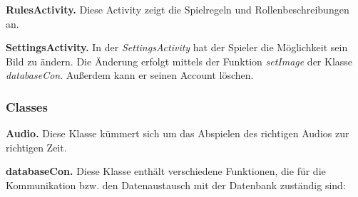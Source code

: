 \documentclass[12pt, a4paper]{article}
\begin{document}
\vspace{0,3 cm}
      
\textbf{RulesActivity.}
Diese Activity zeigt die Spielregeln und Rollenbeschreibungen an.

\vspace{0,3 cm}
      
\textbf{SettingsActivity.}
In der \textit{SettingsActivity} hat der Spieler die Möglichkeit sein Bild zu ändern. Die Änderung erfolgt mittels der Funktion \textit{setImage} der Klasse \textit{databaseCon}. Außerdem kann er seinen Account löschen.
  
  
		\subsubsection{Classes}		
		
\hspace{0,6 cm}\textbf{Audio.}
Diese Klasse kümmert sich um das Abspielen des richtigen Audios zur richtigen Zeit.

\vspace{0,3 cm}

\textbf{databaseCon.}
Diese Klasse enthält verschiedene Funktionen, die für die Kommunikation bzw. den Datenaustausch mit der Datenbank zuständig sind:
\end{document}
